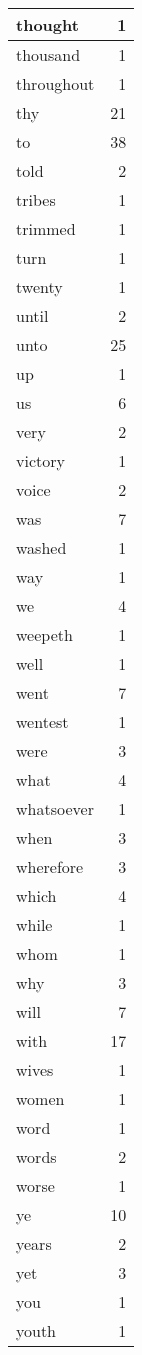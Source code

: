 \begin{center}
\begin{longtable}{l|r}
thought & 1 \\ \hline
thousand & 1 \\ \hline
throughout & 1 \\ \hline
thy & 21 \\ \hline
to & 38 \\ \hline
told & 2 \\ \hline
tribes & 1 \\ \hline
trimmed & 1 \\ \hline
turn & 1 \\ \hline
twenty & 1 \\ \hline
until & 2 \\ \hline
unto & 25 \\ \hline
up & 1 \\ \hline
us & 6 \\ \hline
very & 2 \\ \hline
victory & 1 \\ \hline
voice & 2 \\ \hline
was & 7 \\ \hline
washed & 1 \\ \hline
way & 1 \\ \hline
we & 4 \\ \hline
weepeth & 1 \\ \hline
well & 1 \\ \hline
went & 7 \\ \hline
wentest & 1 \\ \hline
were & 3 \\ \hline
what & 4 \\ \hline
whatsoever & 1 \\ \hline
when & 3 \\ \hline
wherefore & 3 \\ \hline
which & 4 \\ \hline
while & 1 \\ \hline
whom & 1 \\ \hline
why & 3 \\ \hline
will & 7 \\ \hline
with & 17 \\ \hline
wives & 1 \\ \hline
women & 1 \\ \hline
word & 1 \\ \hline
words & 2 \\ \hline
worse & 1 \\ \hline
ye & 10 \\ \hline
years & 2 \\ \hline
yet & 3 \\ \hline
you & 1 \\ \hline
youth & 1 \\ \hline
\end{longtable}
\end{center}



